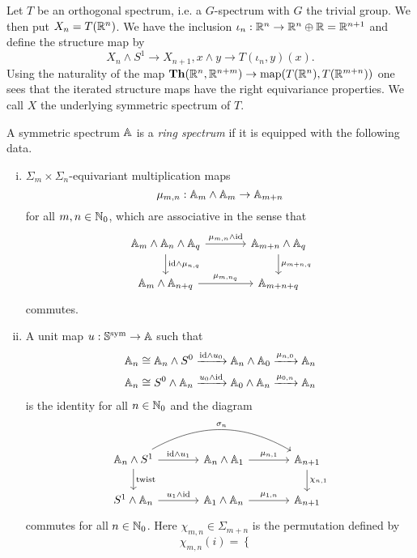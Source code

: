 \begin{bsp}
Let $T$ be an orthogonal spectrum, i.e. a $G$-spectrum with $G$ the trivial group.
We then put $X_n = T(\mathbb{R}^n)$. We have the inclusion $\iota_n:\mathbb{R}^n\to \mathbb{R}^n\oplus \mathbb{R} = \mathbb{R}^{n+1}$
and define the structure map by
\[
X_n\wedge S^1\to X_{n+1}, x\wedge y\to T(\iota_n, y)(x).
\]
Using the naturality of the map $\mathbf{Th}(\mathbb{R}^n, \mathbb{R}^{n+m})\to \mathrm{map}(T(\mathbb{R}^n), T(\mathbb{R}^{m+n}))$
one sees that the iterated structure maps have the right equivariance properties. 
We call $X$ the underlying symmetric spectrum of $T$.
\end{bsp}

\begin{mydef}
A symmetric spectrum $\mathbb{A}$ is a \textit{ring spectrum} if it is equipped with the following data.
\begin{enumerate}[(i)]
\item $\Sigma_m\times \Sigma_n$-equivariant multiplication maps
\[
\mu_{m,n}:\mathbb{A}_m\wedge \mathbb{A}_m\to \mathbb{A}_{m+n}
\]
for all $m,n\in \mathbb{N}_0$, which are associative in the sense that
\[
\begin{tikzcd}[column sep = large]
\A_m\wedge \A_n\wedge \A_q
\arrow{r}{\mu_{m,n}\wedge \mathrm{id}}\arrow{d}{\mathrm{id}\wedge \mu_{n,q}}
&\A_{m+n}\wedge \A_q
\arrow{d}{\mu_{m+n,q}}\\
\A_m\wedge \A_{n+q}
\arrow{r}{\mu_{m, n_q}}
&\A_{m+n+q}
\end{tikzcd}
\]
commutes.
\item A unit map $u:\mathbb{S}^{\mathrm{sym}}\to \mathbb{A}$ such
that
\begin{align*}
\mathbb{A}_n\cong \mathbb{A}_n\wedge S^0&\xrightarrow{\mathrm{id}\wedge u_0} \mathbb{A}_n\wedge \mathbb{A}_0\xrightarrow{\mu_{n,0}} \mathbb{A}_n\\
\mathbb{A}_n\cong S^0\wedge \mathbb{A}_n&\xrightarrow{u_0 \wedge\mathrm{id}} \mathbb{A}_0\wedge \mathbb{A}_n\xrightarrow{\mu_{0,n}} \mathbb{A}_n
\end{align*}
is the identity for all $n\in \mathbb{N}_0$
and the diagram
\[
\begin{tikzcd}[column sep = large]
\A_n\wedge S^1
\arrow{r}{\mathrm{id}\wedge u_1}\arrow{d}{\mathrm{twist}}\arrow[bend left]{rr}{\sigma_n}
&\A_n\wedge \A_1
\arrow{r}{\mu_{n,1}}
&\A_{n+1}
\arrow{d}{\chi_{n,1}}\\
S^1\wedge \A_n
\arrow{r}{u_1\wedge \mathrm{id}}
&\A_1\wedge \A_n
\arrow{r}{\mu_{1,n}}
&\A_{n+1}
\end{tikzcd}
\]
commutes  for all $n\in \mathbb{N}_0$. Here $\chi_{m,n}\in \Sigma_{m+n}$ is the permutation
defined by
\[
\chi_{m,n}(i) = \begin{cases}

\end{cases}\]
\end{enumerate}
\end{mydef}
